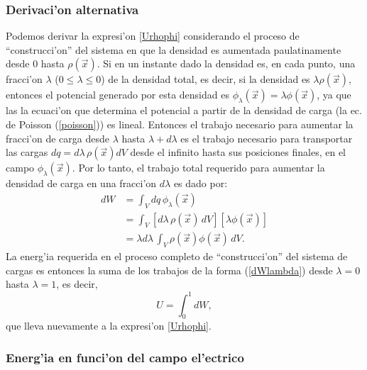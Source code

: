 \subsubsection{Derivaci'on alternativa}
Podemos derivar la expresi'on \eqref{Urhophi} considerando el proceso de ``construcci'on'' del sistema en que la densidad es aumentada paulatinamente desde 0 hasta $\rho(\vec{x})$. Si en un instante dado la densidad es, en cada punto, una fracci'on $\lambda$ ($0\le\lambda\le 0$) de la densidad total, es decir, si la densidad es $\lambda\rho(\vec{x})$, entonces el potencial generado por esta densidad es $\phi_\lambda(\vec{x})=\lambda\phi(\vec{x})$, ya que las la ecuaci'on que determina el potencial a partir de la densidad de carga (la ec. de Poisson (\ref{poisson})) es lineal. Entonces el trabajo necesario para aumentar la fracci'on de carga desde $\lambda$ hasta $\lambda+d\lambda$ es el trabajo necesario para transportar las cargas $dq=d\lambda\,\rho(\vec{x})dV$ desde el infinito hasta sus posiciones finales, en el campo $\phi_\lambda(\vec{x})$. Por lo tanto, el trabajo total requerido para aumentar la densidad de carga en una fracci'on $d\lambda$ es dado por:
\begin{align}
dW &= \int_V dq\,\phi_\lambda(\vec{x}) \\
&= \int_V \left[d\lambda\,\rho(\vec{x})\,dV\right]\left[\lambda\phi(\vec{x})\right] \\
&= \lambda d\lambda\,\int_V \rho(\vec{x})\phi(\vec{x}) \,dV . \label{dWlambda}
\end{align}
La energ'ia requerida en el proceso completo de ``construcci'on'' del sistema de cargas es entonces la suma de los trabajos de la forma (\ref{dWlambda}) desde $\lambda=0$ hasta $\lambda=1$, es decir,
\begin{equation}
U=\int_0^1dW,
\end{equation}
que lleva nuevamente a la expresi'on \eqref{Urhophi}.

\subsubsection{Energ'ia en funci'on del campo el'ectrico}

